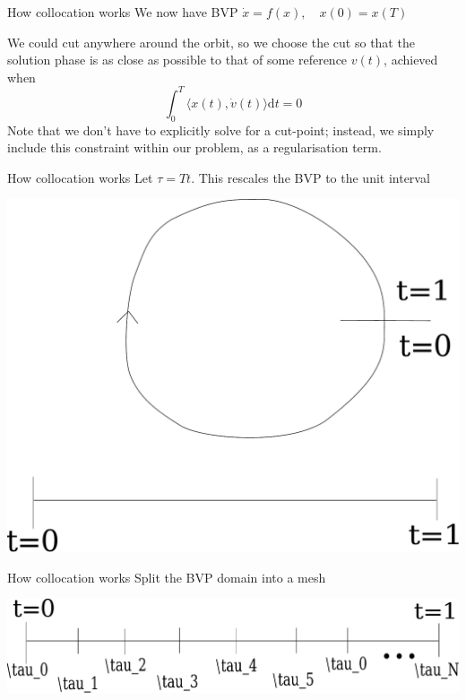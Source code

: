 \documentclass[presentation]{beamer}
\begin{document}
\begin{frame}[label={sec:org6a37d6b},plain]{How collocation works}
We now have BVP \(\dot{x} = f(x), \quad x(0)=x(T)\)
\vfill

We could cut anywhere around the orbit, so we choose the cut so that the solution phase is as close as possible to that of some reference \(v(t)\), achieved when
\[\int_0^T\langle x(t), \dot{v}(t)\rangle\mathrm{d}t = 0\]
\vfill
Note that we don't have to explicitly solve for a cut-point; instead, we simply include this constraint within our problem, as a regularisation term.
\end{frame}

\begin{frame}[label={sec:orga4014af},plain]{How collocation works}
Let \(\tau = Tt\).
This rescales the BVP to the unit interval
\begin{center}
\includegraphics[width=.9\linewidth]{./3_rescale.pdf}
\end{center}
\end{frame}

\begin{frame}[label={sec:org088b490},plain]{How collocation works}
Split the BVP domain into a mesh
\begin{center}
\includegraphics[width=.9\linewidth]{./4_mesh.pdf}
\end{center}
\end{frame}
\end{document}
